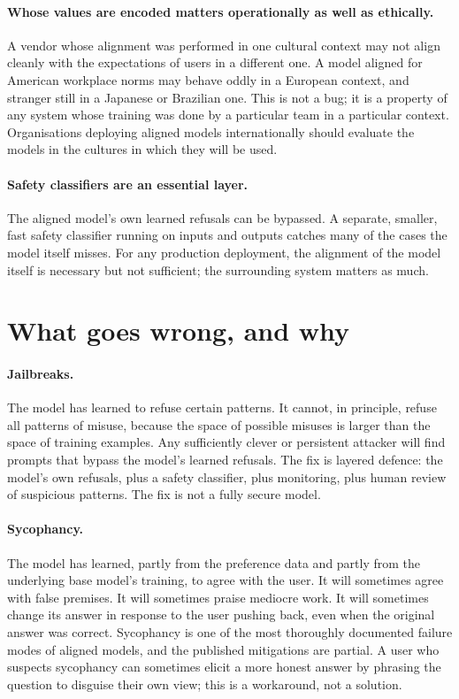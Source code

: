 \paragraph{Whose values are encoded matters operationally as
well as ethically.} A vendor whose alignment was performed in
one cultural context may not align cleanly with the
expectations of users in a different one. A model aligned for
American workplace norms may behave oddly in a European
context, and stranger still in a Japanese or Brazilian one.
This is not a bug; it is a property of any system whose
training was done by a particular team in a particular
context. Organisations deploying aligned models internationally
should evaluate the models in the cultures in which they will
be used.

\paragraph{Safety classifiers are an essential layer.} The
aligned model's own learned refusals can be bypassed. A
separate, smaller, fast safety classifier running on inputs
and outputs catches many of the cases the model itself misses.
For any production deployment, the alignment of the model
itself is necessary but not sufficient; the surrounding system
matters as much.

\section{What goes wrong, and why}

\paragraph{Jailbreaks.} The model has learned to refuse
certain patterns. It cannot, in principle, refuse all patterns
of misuse, because the space of possible misuses is larger
than the space of training examples. Any sufficiently clever
or persistent attacker will find prompts that bypass the
model's learned refusals. The fix is layered defence: the
model's own refusals, plus a safety classifier, plus
monitoring, plus human review of suspicious patterns. The fix
is not a fully secure model.

\paragraph{Sycophancy.} The model has learned, partly from the
preference data and partly from the underlying base model's
training, to agree with the user. It will sometimes agree with
false premises. It will sometimes praise mediocre work. It
will sometimes change its answer in response to the user
pushing back, even when the original answer was correct.
Sycophancy is one of the most thoroughly documented failure
modes of aligned models, and the published mitigations are
partial. A user who suspects sycophancy can sometimes elicit
a more honest answer by phrasing the question to disguise
their own view; this is a workaround, not a solution.

